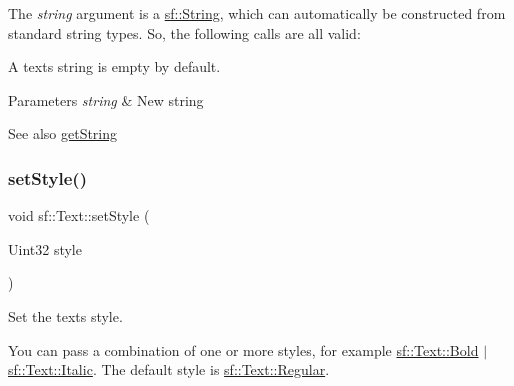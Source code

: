 The {\itshape string} argument is a \mbox{\hyperlink{classsf_1_1_string}{sf\+::\+String}}, which can automatically be constructed from standard string types. So, the following calls are all valid\+: 
\begin{DoxyCode}{0}
\end{DoxyCode}
 A text\textquotesingle{}s string is empty by default.


\begin{DoxyParams}{Parameters}
{\em string} & New string\\
\hline
\end{DoxyParams}
\begin{DoxySeeAlso}{See also}
\mbox{\hyperlink{classsf_1_1_text_a084c275eb4bca835696af5f8f9c80ab3}{get\+String}} \begin{DoxyVerb}\end{DoxyVerb}
 
\end{DoxySeeAlso}
\mbox{\label{classsf_1_1_text_ad791702bc2d1b6590a1719aa60635edf}} 
\subsubsection{\texorpdfstring{setStyle()}{setStyle()}}
{\footnotesize\ttfamily void sf\+::\+Text\+::set\+Style (\begin{DoxyParamCaption}\item[{Uint32}]{style }\end{DoxyParamCaption})}



Set the text\textquotesingle{}s style. 

You can pass a combination of one or more styles, for example \mbox{\hyperlink{classsf_1_1_text_aa8add4aef484c6e6b20faff07452bd82af1b47f98fb1e10509ba930a596987171}{sf\+::\+Text\+::\+Bold}} $\vert$ \mbox{\hyperlink{classsf_1_1_text_aa8add4aef484c6e6b20faff07452bd82aee249eb803848723c542c2062ebe69d8}{sf\+::\+Text\+::\+Italic}}. The default style is \mbox{\hyperlink{classsf_1_1_text_aa8add4aef484c6e6b20faff07452bd82a2af9ae5e1cda126570f744448e0caa32}{sf\+::\+Text\+::\+Regular}}.


